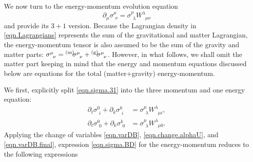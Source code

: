 \documentclass[
10pt, %
a4paper, %
oneside, %
twocolumn,
headinclude,footinclude, %
BCOR5mm, %
]{scrartcl}
\newcommand{\pd}[1]{\partial_{#1}}
\newcommand{\w}[2]{W^{#1}_{\phantom{#1}#2}}
\newcommand{\EMmat}[2]{\sigma^{#1}_{\ \,#2}}
\newcommand{\mat}[1]{\prescript{\text{(m)}}{}{\hspace{-0.1cm}#1}}
\newcommand{\gra}[1]{\prescript{\text{(g)}}{}{\hspace{-0.1cm}#1}}
\begin{document}
	We now turn to the energy-momentum evolution equation
	\begin{equation}\label{eqn.sigma.31}
		\pd{\mu}\EMmat{\mu}{\nu} 
		= \EMmat{\mu}{\lambda} 
		\w{\lambda}{\mu\nu}
	\end{equation}
	and provide its $ 3+1 $ version. Because the Lagrangian density in \eqref{eqn.Lagrangians} 
	represents the sum of the gravitational and matter Lagrangian, the energy-momentum tensor is 
	also 
	assumed to be the sum of the gravity and matter parts: $ \EMmat{\mu}{\nu} = 
	\mat{\EMmat{\mu}{\nu}} 
	+ 
	\gra{\EMmat{\mu}{\nu}} $. However, in what follows, we shall omit the matter part keeping in 
	mind 
	that the energy and momentum equations discussed below are equations for the total 
	(matter+gravity) 
	energy-momentum. 
	
	We first, explicitly split \eqref{eqn.sigma.31} into the three momentum and one energy equation:
	\begin{subequations}\label{eqn.EM.sigma}
		\begin{align}
			\pd{t}\EMmat{0}{i} + \pd{k}\EMmat{k}{i}
			& = \EMmat{\mu}{\lambda} 
			\w{\lambda}{\mu i},\\[2mm]
			\pd{t}\EMmat{0}{0} + \pd{k}\EMmat{k}{0}
			& = \EMmat{\mu}{\lambda} 
			\w{\lambda}{\mu 0}.
		\end{align}
	\end{subequations}
	Applying the change of variables \eqref{eqn.varDB}, \eqref{eqn.change.alphaU}, and 
	\eqref{eqn.varDB.final}, expression \eqref{eqn.sigma.BD} for the energy-momentum reduces to the 
	following expressions
\end{document}
